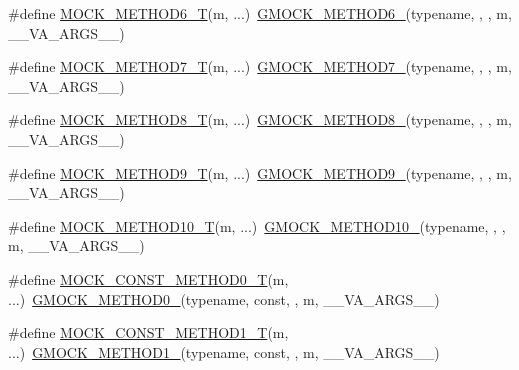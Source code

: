 \begin{DoxyCompactItemize}
\item 
\#define \mbox{\hyperlink{gmock-generated-function-mockers_8h_a0d16357a0043d36b167a1c42ef33f672}{M\+O\+C\+K\+\_\+\+M\+E\+T\+H\+O\+D6\+\_\+T}}(m, ...)~\mbox{\hyperlink{gmock-generated-function-mockers_8h_ad0ca7f6973a076d0af4c953f8ed91842}{G\+M\+O\+C\+K\+\_\+\+M\+E\+T\+H\+O\+D6\+\_\+}}(typename, , , m, \+\_\+\+\_\+\+V\+A\+\_\+\+A\+R\+G\+S\+\_\+\+\_\+)
\item 
\#define \mbox{\hyperlink{gmock-generated-function-mockers_8h_a31bdd1d1448052f4122ecebf937a8f44}{M\+O\+C\+K\+\_\+\+M\+E\+T\+H\+O\+D7\+\_\+T}}(m, ...)~\mbox{\hyperlink{gmock-generated-function-mockers_8h_ab98a8399ba62b53b375c2807f4d39d2f}{G\+M\+O\+C\+K\+\_\+\+M\+E\+T\+H\+O\+D7\+\_\+}}(typename, , , m, \+\_\+\+\_\+\+V\+A\+\_\+\+A\+R\+G\+S\+\_\+\+\_\+)
\item 
\#define \mbox{\hyperlink{gmock-generated-function-mockers_8h_aa7e6573bb6a57f2a2d3c2875caeffaa3}{M\+O\+C\+K\+\_\+\+M\+E\+T\+H\+O\+D8\+\_\+T}}(m, ...)~\mbox{\hyperlink{gmock-generated-function-mockers_8h_aa84a36427c44505207b7cad5dec7ad67}{G\+M\+O\+C\+K\+\_\+\+M\+E\+T\+H\+O\+D8\+\_\+}}(typename, , , m, \+\_\+\+\_\+\+V\+A\+\_\+\+A\+R\+G\+S\+\_\+\+\_\+)
\item 
\#define \mbox{\hyperlink{gmock-generated-function-mockers_8h_a838c68cbdf422cfc703b83daf1d1f1e1}{M\+O\+C\+K\+\_\+\+M\+E\+T\+H\+O\+D9\+\_\+T}}(m, ...)~\mbox{\hyperlink{gmock-generated-function-mockers_8h_aa820171a19cc587c247dbe05cbffc55f}{G\+M\+O\+C\+K\+\_\+\+M\+E\+T\+H\+O\+D9\+\_\+}}(typename, , , m, \+\_\+\+\_\+\+V\+A\+\_\+\+A\+R\+G\+S\+\_\+\+\_\+)
\item 
\#define \mbox{\hyperlink{gmock-generated-function-mockers_8h_aa28723ba52933b5ea9a4ffa1a73d15e1}{M\+O\+C\+K\+\_\+\+M\+E\+T\+H\+O\+D10\+\_\+T}}(m, ...)~\mbox{\hyperlink{gmock-generated-function-mockers_8h_a81a48223a8771de36ef92ac6d56f6e81}{G\+M\+O\+C\+K\+\_\+\+M\+E\+T\+H\+O\+D10\+\_\+}}(typename, , , m, \+\_\+\+\_\+\+V\+A\+\_\+\+A\+R\+G\+S\+\_\+\+\_\+)
\item 
\#define \mbox{\hyperlink{gmock-generated-function-mockers_8h_a5fc82f3de9d5e83b0a6bb6cda98a8887}{M\+O\+C\+K\+\_\+\+C\+O\+N\+S\+T\+\_\+\+M\+E\+T\+H\+O\+D0\+\_\+T}}(m, ...)~\mbox{\hyperlink{gmock-generated-function-mockers_8h_ae0d290ffa58d7c624b2e3487ba1252f4}{G\+M\+O\+C\+K\+\_\+\+M\+E\+T\+H\+O\+D0\+\_\+}}(typename, const, , m, \+\_\+\+\_\+\+V\+A\+\_\+\+A\+R\+G\+S\+\_\+\+\_\+)
\item 
\#define \mbox{\hyperlink{gmock-generated-function-mockers_8h_a46dfe8631eee86b15a79aff8a2866621}{M\+O\+C\+K\+\_\+\+C\+O\+N\+S\+T\+\_\+\+M\+E\+T\+H\+O\+D1\+\_\+T}}(m, ...)~\mbox{\hyperlink{gmock-generated-function-mockers_8h_a1bc0012d62440dda77208dabdf4925c9}{G\+M\+O\+C\+K\+\_\+\+M\+E\+T\+H\+O\+D1\+\_\+}}(typename, const, , m, \+\_\+\+\_\+\+V\+A\+\_\+\+A\+R\+G\+S\+\_\+\+\_\+)

\end{DoxyCompactItemize}
